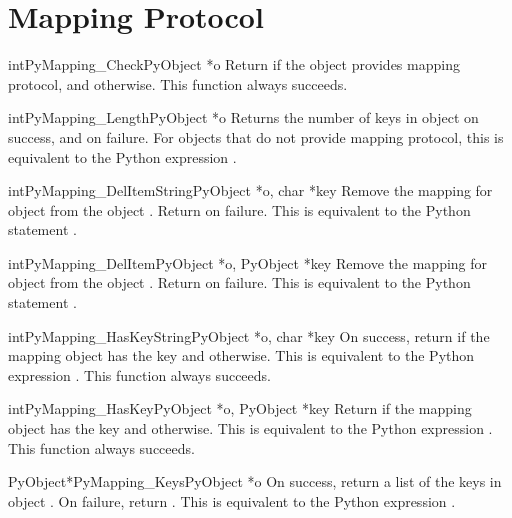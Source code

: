 \documentclass{manual}
\begin{document}
\section{Mapping Protocol \label{mapping}}

\begin{cfuncdesc}{int}{PyMapping_Check}{PyObject *o}
Return  if the object provides mapping protocol, and
 otherwise.  This function always succeeds.
\end{cfuncdesc}


\begin{cfuncdesc}{int}{PyMapping_Length}{PyObject *o}
Returns the number of keys in object  on success, and
 on failure.  For objects that do not provide mapping
protocol, this is equivalent to the Python expression
.
\end{cfuncdesc}


\begin{cfuncdesc}{int}{PyMapping_DelItemString}{PyObject *o, char *key}
Remove the mapping for object  from the object .
Return  on failure.  This is equivalent to
the Python statement .
\end{cfuncdesc}


\begin{cfuncdesc}{int}{PyMapping_DelItem}{PyObject *o, PyObject *key}
Remove the mapping for object  from the object .
Return  on failure.  This is equivalent to
the Python statement .
\end{cfuncdesc}


\begin{cfuncdesc}{int}{PyMapping_HasKeyString}{PyObject *o, char *key}
On success, return  if the mapping object has the key
 and  otherwise.  This is equivalent to the Python
expression . 
This function always succeeds.
\end{cfuncdesc}


\begin{cfuncdesc}{int}{PyMapping_HasKey}{PyObject *o, PyObject *key}
Return  if the mapping object has the key  and
 otherwise.  This is equivalent to the Python expression
. 
This function always succeeds.
\end{cfuncdesc}


\begin{cfuncdesc}{PyObject*}{PyMapping_Keys}{PyObject *o}
On success, return a list of the keys in object .  On
failure, return \NULL{}. This is equivalent to the Python
expression .
\end{cfuncdesc}
\end{document}

